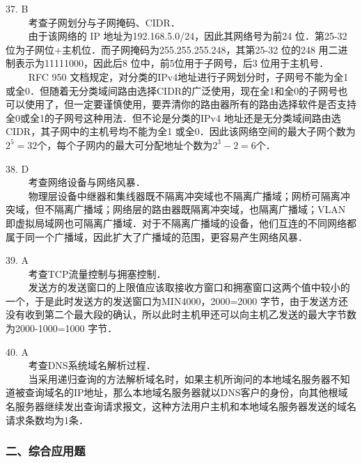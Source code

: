 37. B \\
$\qquad$ 考查子网划分与子网掩码、CIDR．\\
$\qquad$ 由于该网络的 IP 地址为192.168.5.0/24，因此其网络号为前24 位．第25-32 位为子网位+主机位．而子网掩码为255.255.255.248，其第25-32 位的248 用二进制表示为11111000，因此后8 位中，前5位用于子网号，后3 位用于主机号． \\
$\qquad$ RFC 950 文档规定，对分类的IPv4地址进行子网划分时，子网号不能为全1或全0．但随着无分类域间路由选择CIDR的广泛使用，现在全1和全0的子网号也可以使用了，但一定要谨慎使用，要弄清你的路由器所有的路由选择软件是否支持全0或全1的子网号这种用法．但不论是分类的IPv4 地址还是无分类域间路由选CIDR，其子网中的主机号均不能为全1 或全0．因此该网络空间的最大子网个数为$2^5=32$个，每个子网内的最大可分配地址个数为$2^3-2=6$个．

38. D \\
$\qquad$ 考查网络设备与网络风暴． \\
$\qquad$ 物理层设备中继器和集线器既不隔离冲突域也不隔离广播域；网桥可隔离冲突域，但不隔离广播域；网络层的路由器既隔离冲突域，也隔离广播域；VLAN 即虚拟局域网也可隔离广播域．对于不隔离广播域的设备，他们互连的不同网络都属于同一个广播域，因此扩大了广播域的范围，更容易产生网络风暴．

39. A \\
$\qquad$ 考查TCP流量控制与拥塞控制．\\
$\qquad$ 发送方的发送窗口的上限值应该取接收方窗口和拥塞窗口这两个值中较小的一个，于是此时发送方的发送窗口为MIN{4000，2000}=2000 字节，由于发送方还没有收到第二个最大段的确认，所以此时主机甲还可以向主机乙发送的最大字节数为2000-1000=1000 字节．

40. A \\
$\qquad$ 考查DNS系统域名解析过程．\\
$\qquad$ 当采用递归查询的方法解析域名时，如果主机所询问的本地域名服务器不知道被查询域名的IP地址，那么本地域名服务器就以DNS客户的身份，向其他根域名服务器继续发出查询请求报文，这种方法用户主机和本地域名服务器发送的域名请求条数均为1条．

\subsubsection{二、综合应用题}

